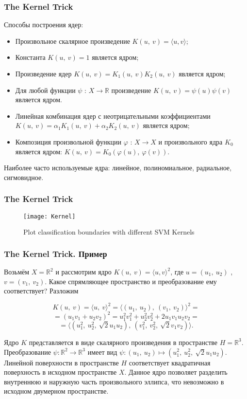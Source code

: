 \documentclass[11pt]{beamer}
\begin{document}
\begin{frame}
	\frametitle{The Kernel Trick}
	Способы построения ядер:
	
	\begin{itemize}
		\item Произвольное скалярное произведение $K(u,\ v)=\langle u,  v \rangle$;
		\item Константа $K(u,\ v)=1$ является ядром;
		\item Произведение ядер $K(u,\ v)=K_{1}(u,\ v)K_{2}(u,\ v)$ является ядром;
		\item Для любой функции $\psi$ : $X\rightarrow \mathbb{R}$ произведение $K(u,\ v)=\psi(u)\psi(v)$ является ядром.
		\item Линейная комбинация ядер с неотрицательными коэффициентами $K(u,\ v)=\alpha_{1}K_{1}(u,\ v)+\alpha_{2}K_{2}(u,\ v)$ является ядром;
		\item Композиция произвольной функции  $\varphi$ : $X\rightarrow X$ и произвольного ядра $K_{0}$ является ядром: $K(u,\ v)=K_{0}(\varphi(u),\ \varphi(v))$.
	\end{itemize}
	
	Наиболее часто используемые ядра: линейное, полиномиальное, радиальное, сигмовидное.
	
\end{frame}
\begin{frame}
	\frametitle{The Kernel Trick}
	
		\begin{figure}
		\centering
		\texttt{[image: Kernel]}
		\caption{Plot classification boundaries with different SVM Kernels}
		\label{4}
	\end{figure}

\end{frame}
\begin{frame}
	\frametitle{The Kernel Trick. Пример}
	
	Возьмём $X=\mathbb{R}^{2}$ и рассмотрим ядро $K(u,\ v)=\langle u, v\rangle^{2}$, где $u=(u_{1},\ u_{2})$ , $v=(v_{1},\ v_{2})$. Какое спрямляющее пространство и преобразование ему соответствует? Разложим 
	
	$$
	K(u,\ v)=\langle u,\ v\rangle^{2}=\langle(u_{1},\ u_{2}),\ (v_{1},\ v_{2})\rangle^{2}=
	$$
	$$
	=(u_{1}v_{1}+u_{2}v_{2})^{2}=u_{1}^{2}v_{1}^{2}+u_{2}^{2}v_{2}^{2}+2u_{1}v_{1}u_{2}v_{2}=
	$$
	$$
	=\langle(u_{1}^{2},\ u_{2}^{2},\ \sqrt{2}u_{1}u_{2}),\ (v_{1}^{2},\ v_{2}^{2},\ \sqrt{2}v_{1}v_{2})\rangle.
	$$
	
	Ядро $K$ представляется в виде скалярного произведения в пространстве $H = \mathbb{R}^{3}$. Преобразование $\psi:\mathbb{R}^{2}\rightarrow \mathbb{R}^{3}$ имеет вид $\psi:(u_{1},\ u_{2})\mapsto(u_{1}^{2},\ u_{2}^{2},\ \sqrt{2}u_{1}u_{2})$. Линейной поверхности в пространстве $H$ соответствует квадратичная поверхность в исходном пространстве $X$. Данное ядро позволяет разделить внутреннюю и наружную часть произвольного эллипса, что невозможно в исходном двумерном пространстве.
\end{frame}
\end{document}
